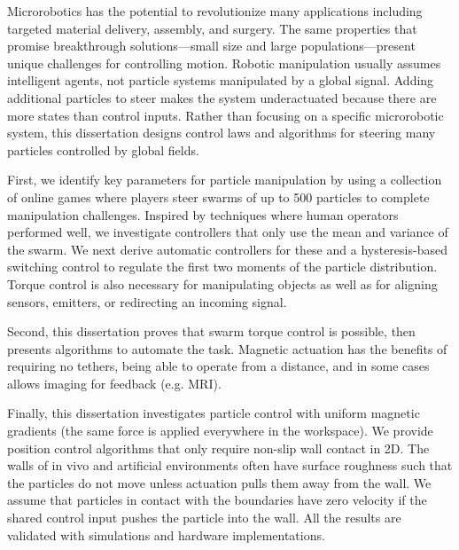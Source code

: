 


Microrobotics has the potential to revolutionize many applications including targeted material delivery, assembly, and surgery.  The same properties that promise breakthrough solutions---small size and large populations---present unique challenges for controlling motion. 
Robotic manipulation usually assumes intelligent agents, not particle systems manipulated by a global signal.
 Adding additional particles to steer makes the system underactuated because there are more states than control inputs. 
 Rather than focusing on a specific microrobotic system, this dissertation designs control laws and algorithms for steering many particles controlled by global fields.
 
 First, we identify key parameters for particle manipulation by using a collection of online games where players steer swarms of up to 500 particles to complete manipulation challenges. Inspired by techniques where human operators performed well, we investigate controllers that only use the mean and variance of the swarm. We next derive automatic controllers for these and a hysteresis-based switching control to regulate the first two moments of the particle distribution. Torque control is also necessary for manipulating objects as well as for aligning sensors, emitters, or redirecting an incoming signal. 
 
 Second, this dissertation proves that swarm torque control is possible, then presents algorithms to automate the task. 
 Magnetic actuation has the benefits of requiring no tethers, being able to operate from a distance, and in some cases allows imaging for feedback (e.g. MRI).
 
 Finally, this dissertation investigates particle control with uniform magnetic gradients (the same force is applied everywhere in the workspace).
 We provide position control algorithms that only require non-slip wall contact in 2D.
 The walls of in vivo and artificial environments often have surface roughness such that the particles do not move unless actuation pulls them away from the wall.
We assume that particles in contact with the boundaries have zero velocity if the shared control input pushes the particle into the wall. 
All the results are validated with simulations and hardware implementations.

